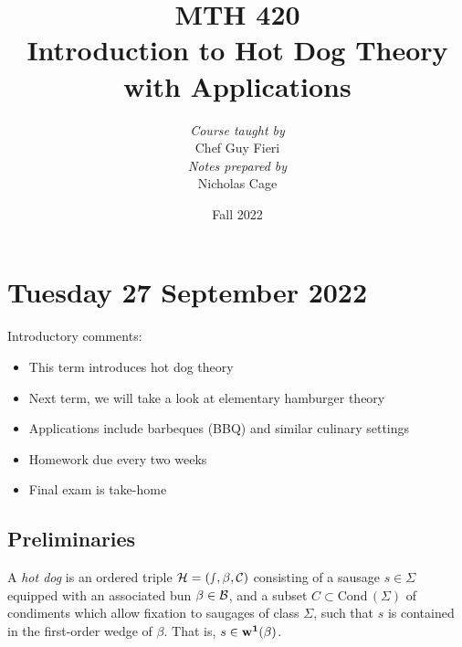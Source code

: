 \documentclass[12pt,notitlepage]{report}
\makeatletter
\newcommand\MYNAME{Nicholas Cage}
\newcommand\INSTRUCTOR{Chef Guy Fieri}
\newcommand\TERM{Fall 2022}
\newcommand\COURSENUMB{MTH 420}
\newcommand\COURSENAME{Introduction to Hot Dog Theory with Applications}
\newcommand*{\toccontents}{\@starttoc{toc}}
\newcommand\resetpagenumber{\setcounter{page}{0}\pagenumbering{arabic}}
\makeatother
\begin{document}
\title{\large \COURSENUMB\\ \COURSENAME}
\date{\TERM}
\author{
	\small\textit{Course taught by}\\
	\INSTRUCTOR
	\\[12pt]
	\small\textit{Notes prepared by}\\
	\MYNAME
}
\maketitle
\toccontents

\chapter{Tuesday 27 September 2022}

	\resetpagenumber

	Introductory comments:
	\begin{itemize}
		\item This term introduces hot dog theory
		\item Next term, we will take a look at elementary hamburger theory
		\item Applications include barbeques (BBQ) and similar
			culinary settings
		\item Homework due every two weeks
		\item Final exam is take-home
	\end{itemize}

	\section{Preliminaries}

		\begin{dfn}
			A \emph{hot dog} is an ordered triple $\cal H=(s,\beta,C)$
			consisting of a sausage $s\in\Sigma$ equipped with an associated
			bun $\beta\in\cal B$,
			and a subset $C\subset\text{Cond}\,(\Sigma)$
			of condiments which allow fixation to saugages of class $\Sigma$,
			such that $s$ is contained in the first-order wedge of $\beta$.
			That is, $s\in\bf{w}^1(\beta)$.
		\end{dfn}
\end{document}
